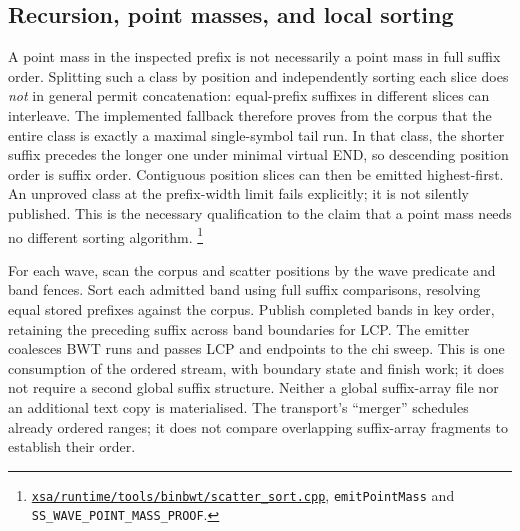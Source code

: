 \documentclass[10pt]{article}
\newcommand{\ev}[2]{\footnote{\href{https://github.com/pangenome/sxgc/blob/c46a85217b9b269c91179cbebc396f96453181af/#1}{\nolinkurl{#1}}, #2.}}
\begin{document}
\subsection{Recursion, point masses, and local sorting}
A point mass in the inspected prefix is not necessarily a point mass in full suffix order.
Splitting such a class by position and independently sorting each slice does \emph{not} in
general permit concatenation: equal-prefix suffixes in different slices can interleave.
The implemented fallback therefore proves from the corpus that the entire class is exactly
a maximal single-symbol tail run. In that class, the shorter suffix precedes the longer one
under minimal virtual END, so descending position order is suffix order. Contiguous position
slices can then be emitted highest-first. An unproved class at the prefix-width limit fails
explicitly; it is not silently published. This is the necessary qualification to the claim
that a point mass needs no different sorting algorithm.
\ev{xsa/runtime/tools/binbwt/scatter_sort.cpp}{\texttt{emitPointMass} and
\texttt{SS\_WAVE\_POINT\_MASS\_PROOF}}

For each wave, scan the corpus and scatter positions by the wave predicate and band fences.
Sort each admitted band using full suffix comparisons, resolving equal stored prefixes against
the corpus. Publish completed bands in key order, retaining the preceding suffix across band
boundaries for LCP. The emitter coalesces BWT runs and passes LCP and endpoints to the chi sweep.
This is one consumption of the ordered stream, with boundary state and finish work; it does
not require a second global suffix structure. Neither a global suffix-array file nor an
additional text copy is materialised. The transport's ``merger'' schedules already ordered
ranges; it does not compare overlapping suffix-array fragments to establish their order.
\end{document}
